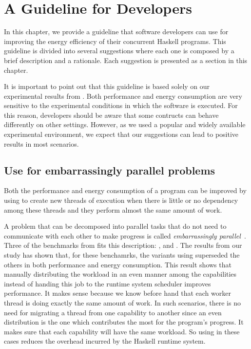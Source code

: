 \chapter{A Guideline for Developers}
In this chapter, we provide a guideline that software developers can use for improving the energy efficiency of their concurrent Haskell programs. This guideline is divided into several suggestions where each one is composed by a brief description and a rationale. Each suggestion is presented as a section in this chapter.

It is important to point out that this guideline is based solely on our experimental results from . Both performance and energy consumption are very sensitive to the experimental conditions in which the software is executed. For this reason, developers should be aware that some contructs can behave differently on other settings. However, as we used a popular and widely available experimental environment, we expect that our suggestions can lead to positive results in most scenarios.


\section{Use \forkOn for embarrassingly parallel problems}
 Both the performance and energy consumption of a program can be improved by using \forkOn to create new threads of execution when there is little or no dependency among these threads and they perform almost the same amount of work.
\newline

 A problem that can be decomposed into parallel tasks that do not need to communicate with each other to make progress is called \emph{embarrassingly parallel}~\cite{herlihy:2012}. Three of the benchmarks from  fits this description: \mandelbrot, \regex and \spectral. The results from our study has shown that, for these benchamrks, the variants using \forkOn superseded the others in both performance and energy consumption. This result shows that manually distributing the workload in an even manner among the capabilities instead of handing this job to the runtime system scheduler improves performance. It makes sense because we know before hand that each worker thread is doing exactly the same amount of work. In such scenarios, there is no need for migrating a thread from one capability to another since an even distribution is the one which contributes the most for the program's progress. It makes sure that each capability will have the same workload. So using \forkOn in these cases reduces the overhead incurred by the Haskell runtime system.

